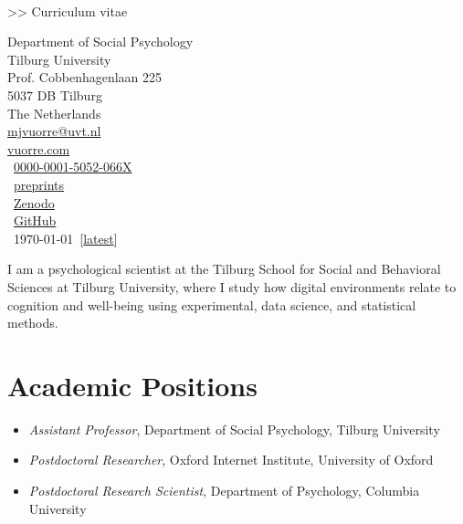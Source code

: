 \documentclass[12pt, a4paper]{article}
\newcommand{\years}[1]{\marginnote{\scriptsize #1}}
\begin{document}
\\[4pt]
{\Large >> Curriculum vitae}
\vspace{24pt}

\setlength\multicolsep{0pt}
\begin{multicols}{2}
Department of Social Psychology\\
Tilburg University\\
Prof. Cobbenhagenlaan 225\\
5037 DB Tilburg\\
The Netherlands\\
 \href{mailto:mjvuorre@uvt.nl}{mjvuorre@uvt.nl}\\
\vfill\null
\columnbreak
{} \href{https://vuorre.com}{vuorre.com}\\
\aiOrcid \ \href{https://orcid.org/0000-0001-5052-066X}{0000-0001-5052-066X}\\
\aiPsyArXiv \ \href{https://osf.io/preprints/psyarxiv/discover?activeFilters=[{"propertyVisibleLabel":"Creator","propertyPathKey":"creator","label":"Matti%
\aiZenodoSquare \ \href{https://zenodo.org/search?q=metadata.creators.person_or_org.name%3A%22Matti%20Vuorre%22&l=list&p=1&s=10&sort=publication-desc}{Zenodo} \\
\faGithub \ \href{https://github.com/mvuorre}{GitHub}\\
\aiCV \ \today \ [\href{https://github.com/mvuorre/CV/raw/main/vuorre-matti.pdf}{latest}]
\end{multicols}

I am a psychological scientist at the Tilburg School for Social and Behavioral Sciences at Tilburg University, where I study how digital environments relate to cognition and well-being using experimental, data science, and statistical methods. 

\section*{Academic Positions}
\begin{itemize}
  \item \years{2023 - now} \emph{Assistant Professor}, Department of Social Psychology, Tilburg University
  \item \years{2020 - 2022} \emph{Postdoctoral Researcher}, Oxford Internet Institute, University of Oxford
  \item \years{2018 - 2020} \emph{Postdoctoral Research Scientist}, Department of Psychology, Columbia University
\end{itemize}
\end{document}
